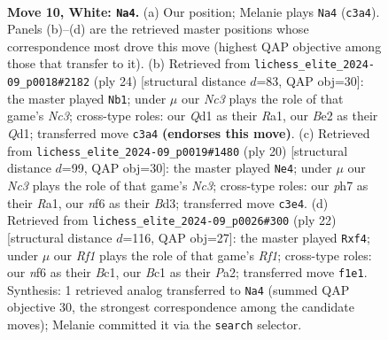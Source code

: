 \documentclass[11pt]{article}
\begin{document}
\clearpage

\begin{figure}[p]\centering
\begin{subfigure}{0.46\textwidth}\centering
\resizebox{\linewidth}{!}{%
\newchessgame
\chessboard[
  setfen={r1bq1b1r/p2nkppp/2p1pn2/8/1p1P4/2N1PN2/PP2BPPP/R1BQ1RK1 w - - 0 10},
  showmover=false,
  pgfstyle=straightmove, color=movearrow, markmove={c3-a4}
]}
\caption{}
\end{subfigure}\hfill
\begin{subfigure}{0.46\textwidth}\centering
\resizebox{\linewidth}{!}{%
\newchessgame
\chessboard[
  setfen={1rbqk2r/3nbppp/3p1n2/3Pp3/1p6/2N3P1/1PP1NPBP/R1BQ1RK1 w k - 0 13},
  showmover=false,
  pgfstyle=straightmove, color=movearrow, markmove={c3-b1}
]}
\caption{}
\end{subfigure}
\\[4pt]
\begin{subfigure}{0.46\textwidth}\centering
\resizebox{\linewidth}{!}{%
\newchessgame
\chessboard[
  setfen={r1bqkb1r/3n1ppp/p3pn2/2p5/Pp1P4/2NBPN2/1P3PPP/R1BQ1RK1 w kq - 0 11},
  showmover=false,
  pgfstyle=straightmove, color=movearrow, markmove={c3-e4}
]}
\caption{}
\end{subfigure}\hfill
\begin{subfigure}{0.46\textwidth}\centering
\resizebox{\linewidth}{!}{%
\newchessgame
\chessboard[
  setfen={r2b1rk1/pp1qnppp/2np4/2p5/2P1Pp2/2N1N3/PP1P2PP/R1BQ1RK1 w - - 0 12},
  showmover=false,
  pgfstyle=straightmove, color=movearrow, markmove={f1-f4}
]}
\caption{}
\end{subfigure}
\caption{\textbf{Move 10, White: \texttt{Na4}.} (a) Our position; Melanie plays \texttt{Na4} (\texttt{c3a4}). Panels (b)--(d) are the retrieved master positions whose correspondence most drove this move (highest QAP objective among those that transfer to it). (b) Retrieved from \texttt{lichess\_elite\_2024-09\_p0018\#2182} (ply 24) [structural distance $d$=83, QAP obj=30]: the master played \texttt{Nb1}; under $\mu$ our \emph{Nc3} plays the role of that game's \emph{Nc3}; cross-type roles: our \emph{Q}d1 as their \emph{R}a1, our \emph{B}e2 as their \emph{Q}d1; transferred move \texttt{c3a4} \textbf{(endorses this move)}. (c) Retrieved from \texttt{lichess\_elite\_2024-09\_p0019\#1480} (ply 20) [structural distance $d$=99, QAP obj=30]: the master played \texttt{Ne4}; under $\mu$ our \emph{Nc3} plays the role of that game's \emph{Nc3}; cross-type roles: our \emph{p}h7 as their \emph{R}a1, our \emph{n}f6 as their \emph{B}d3; transferred move \texttt{c3e4}. (d) Retrieved from \texttt{lichess\_elite\_2024-09\_p0026\#300} (ply 22) [structural distance $d$=116, QAP obj=27]: the master played \texttt{Rxf4}; under $\mu$ our \emph{Rf1} plays the role of that game's \emph{Rf1}; cross-type roles: our \emph{n}f6 as their \emph{B}c1, our \emph{B}c1 as their \emph{P}a2; transferred move \texttt{f1e1}. Synthesis: 1 retrieved analog transferred to \texttt{Na4} (summed QAP objective 30, the strongest correspondence among the candidate moves); Melanie committed it via the \texttt{search} selector.}
\label{fig:thought-m18}
\end{figure}
\end{document}
